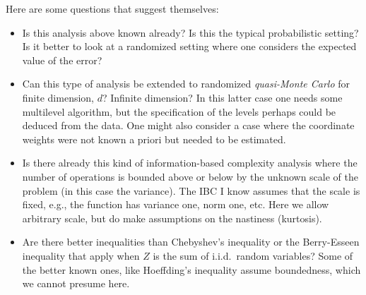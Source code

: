 \documentclass[graybox]{svmult}
\begin{document}
Here are some questions that suggest themselves:

\begin{itemize}

\item Is this analysis above known already?  Is this the typical probabilistic setting?  Is it better to look at a randomized setting where one considers the expected value of the error?

\item Can this type of analysis be extended to randomized \emph{quasi-Monte Carlo} for finite dimension, $d$?  Infinite dimension?  In this latter case one needs some multilevel algorithm, but the specification of the levels perhaps could be deduced from the data.  One might also consider a case where the coordinate weights were not known a priori but needed to be estimated.

\item Is there already this kind of information-based complexity analysis where the number of operations is bounded above or below by the unknown scale of the problem (in this case the variance).  The IBC I know assumes that the scale is fixed, e.g., the function has variance one, norm one, etc.  Here we allow arbitrary scale, but do make assumptions on the nastiness (kurtosis).

\item Are there better inequalities than Chebyshev's inequality or the Berry-Esseen inequality that apply when $Z$ is the sum of i.i.d.\ random variables?  Some of the better known ones, like Hoeffding's inequality assume boundedness, which we cannot presume here.

\end{itemize}
\end{document}
